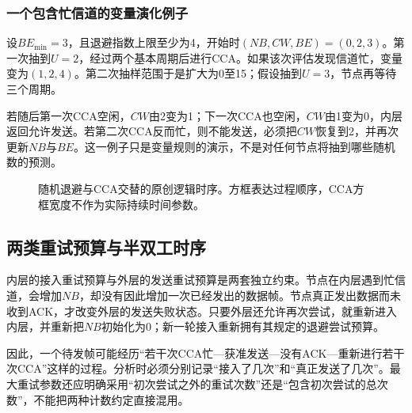 \subsubsection{一个包含忙信道的变量演化例子}

设$BE_{\min}=3$，且退避指数上限至少为4，开始时$(NB,CW,BE)=(0,2,3)$。第一次抽到$U=2$，经过两个基本周期后进行CCA。如果该次评估发现信道忙，变量变为$(1,2,4)$。第二次抽样范围于是扩大为0至15；假设抽到$U=3$，节点再等待三个周期。

若随后第一次CCA空闲，$CW$由2变为1；下一次CCA也空闲，$CW$由1变为0，内层返回允许发送。若第二次CCA反而忙，则不能发送，必须把$CW$恢复到2，并再次更新$NB$与$BE$。这一例子只是变量规则的演示，不是对任何节点将抽到哪些随机数的预测。

\begin{figure}[htbp]
\centering
{}
\caption{随机退避与CCA交替的原创逻辑时序。方框表达过程顺序，CCA方框宽度不作为实际持续时间参数。}
\label{fig:p4-cca}
\end{figure}

\subsection{两类重试预算与半双工时序}

内层的接入重试预算与外层的发送重试预算是两套独立约束。节点在内层遇到忙信道，会增加$NB$，却没有因此增加一次已经发出的数据帧。节点真正发出数据而未收到ACK，才改变外层的发送失败状态。只要外层还允许再次尝试，就重新进入内层，并重新把$NB$初始化为0；新一轮接入重新拥有其规定的退避尝试预算。

因此，一个待发帧可能经历“若干次CCA忙---获准发送---没有ACK---重新进行若干次CCA”这样的过程。分析时必须分别记录“接入了几次”和“真正发送了几次”。最大重试参数还应明确采用“初次尝试之外的重试次数”还是“包含初次尝试的总次数”，不能把两种计数约定直接混用。

